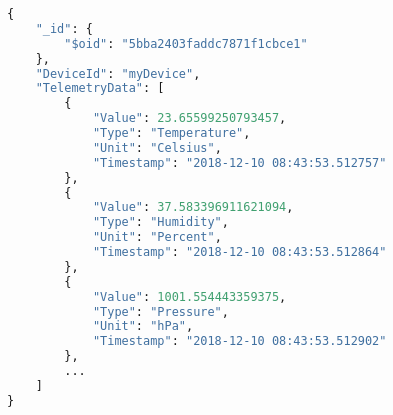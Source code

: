 \begin{lstlisting}[language=Python, caption=Telemetry Data, label={lst:telemetry}, basicstyle=\tiny]
{
    "_id": {
        "$oid": "5bba2403faddc7871f1cbce1"
    },
    "DeviceId": "myDevice",
    "TelemetryData": [
        {
            "Value": 23.65599250793457,
            "Type": "Temperature",
            "Unit": "Celsius",
            "Timestamp": "2018-12-10 08:43:53.512757"
        },
        {
            "Value": 37.583396911621094,
            "Type": "Humidity",
            "Unit": "Percent",
            "Timestamp": "2018-12-10 08:43:53.512864"
        },
        {
            "Value": 1001.554443359375,
            "Type": "Pressure",
            "Unit": "hPa",
            "Timestamp": "2018-12-10 08:43:53.512902"
        },
        ...
    ]
}
\end{lstlisting}